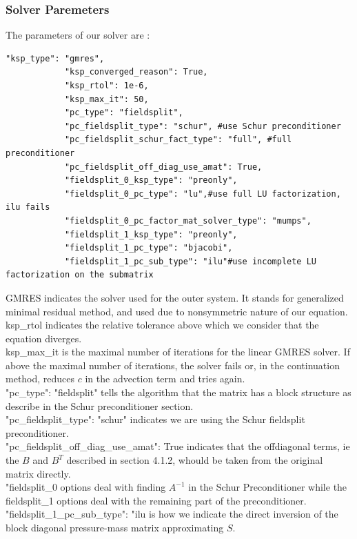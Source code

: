 \documentclass[11pt,twoside,a4paper]{article}
\begin{document}
\subsubsection{Solver Paremeters}
The parameters of our solver are :
\begin{lstlisting}
"ksp_type": "gmres",
            "ksp_converged_reason": True,
            "ksp_rtol": 1e-6,
            "ksp_max_it": 50,
            "pc_type": "fieldsplit",
            "pc_fieldsplit_type": "schur", #use Schur preconditioner
            "pc_fieldsplit_schur_fact_type": "full", #full preconditioner
            "pc_fieldsplit_off_diag_use_amat": True,
            "fieldsplit_0_ksp_type": "preonly",
            "fieldsplit_0_pc_type": "lu",#use full LU factorization, ilu fails
            "fieldsplit_0_pc_factor_mat_solver_type": "mumps",
            "fieldsplit_1_ksp_type": "preonly",
            "fieldsplit_1_pc_type": "bjacobi",
            "fieldsplit_1_pc_sub_type": "ilu"#use incomplete LU factorization on the submatrix
\end{lstlisting}
GMRES indicates the solver used for the outer system.
 It stands for generalized minimal residual method, and used due to nonsymmetric nature of our equation.\\
ksp\_rtol indicates the relative tolerance above which we consider that the equation diverges.\\
ksp\_max\_it is the maximal number of iterations for the linear GMRES solver. If above the maximal number of iterations, the solver fails or, in the continuation method, reduces $c$ in the advection term and tries again.\\
"pc\_type": "fieldsplit" tells the algorithm that the matrix has a block structure as describe in the Schur preconditioner section.\\
"pc\_fieldsplit\_type": "schur" indicates we are using the Schur fieldsplit preconditioner.\\
"pc\_fieldsplit\_off\_diag\_use\_amat": True indicates that the offdiagonal terms, ie the $B$ and $B^T$ described in section 4.1.2, whould be taken from the original matrix directly. \\
"fieldsplit\_0 options deal with finding $A^{-1}$ in the Schur Preconditioner while the fieldsplit\_1 options deal with the remaining part of the preconditioner.\\
 "fieldsplit\_1\_pc\_sub\_type": "ilu is how we indicate the direct inversion of the block diagonal pressure-mass matrix approximating $S$.
\end{document}
